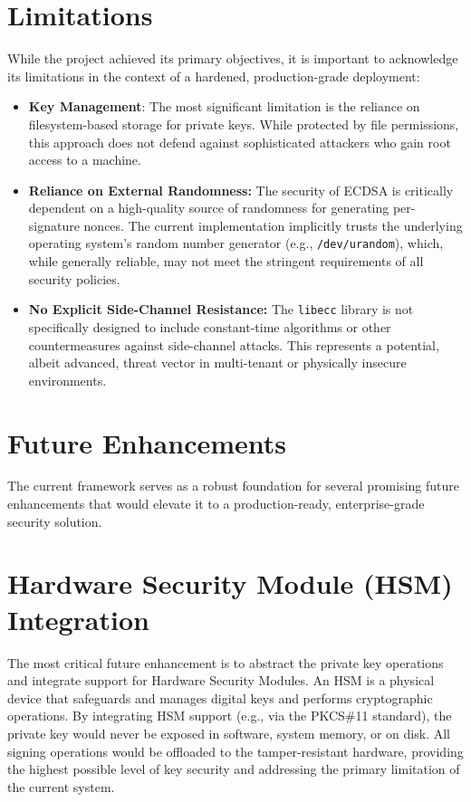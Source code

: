 \section{Limitations}
While the project achieved its primary objectives, it is important to acknowledge its limitations in the context of a hardened, production-grade deployment:
\begin{itemize}
\item \textbf{Key Management}: The most significant limitation is the reliance on filesystem-based storage for private keys. While protected by file permissions, this approach does not defend against sophisticated attackers who gain root access to a machine.
\item \textbf{Reliance on External Randomness:} The security of ECDSA is critically dependent on a high-quality source of randomness for generating per-signature nonces. The current implementation implicitly trusts the underlying operating system's random number generator (e.g., \texttt{/dev/urandom}), which, while generally reliable, may not meet the stringent requirements of all security policies.
\item \textbf{No Explicit Side-Channel Resistance:} The \texttt{libecc} library is not specifically designed to include constant-time algorithms or other countermeasures against side-channel attacks. This represents a potential, albeit advanced, threat vector in multi-tenant or physically insecure environments.
\end{itemize}
	
\section{Future Enhancements}
The current framework serves as a robust foundation for several promising future enhancements that would elevate it to a production-ready, enterprise-grade security solution.

\section{Hardware Security Module (HSM) Integration}
The most critical future enhancement is to abstract the private key operations and integrate support for Hardware Security Modules. An HSM is a physical device that safeguards and manages digital keys and performs cryptographic operations. By integrating HSM support (e.g., via the PKCS\#11 standard), the private key would never be exposed in software, system memory, or on disk. All signing operations would be offloaded to the tamper-resistant hardware, providing the highest possible level of key security and addressing the primary limitation of the current system.

